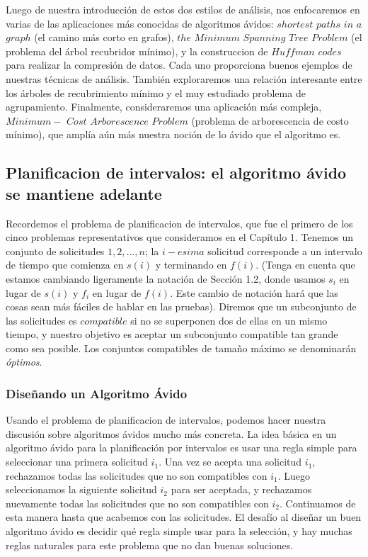 \documentclass[a4paper, 12pt]{book}
\begin{document}
Luego de nuestra introducción de estos dos estilos de análisis, nos enfocaremos en varias de las aplicaciones más conocidas de algoritmos ávidos: $shortest$ $paths$ $in$ $a$ $graph$ (el camino más corto en grafos), $the$ $Minimum$ $Spanning$ $Tree$ $Problem$ (el problema del árbol recubridor mínimo), y la construccion de $Huffman$ $codes$ para realizar la compresión de datos. Cada uno proporciona buenos ejemplos de nuestras técnicas de análisis. También exploraremos una relación interesante entre los árboles de recubrimiento mínimo y el muy estudiado problema de agrupamiento. Finalmente, consideraremos una aplicación más compleja, $Minimum-$ $Cost$ $Arborescence$ $Problem$ (problema de arborescencia de costo mínimo), que amplía aún más nuestra noción de lo ávido que el algoritmo es.\\


\subsection{Planificacion de intervalos: el algoritmo ávido se mantiene adelante} Recordemos el problema de planificacion de intervalos, que fue el primero de los cinco problemas representativos que consideramos en el Capítulo 1. Tenemos un conjunto de solicitudes ${1, 2,. . . , n}$; la $i- esima$ solicitud corresponde a un intervalo de tiempo que comienza en $s(i)$ y terminando en $f (i)$. (Tenga en cuenta que estamos cambiando ligeramente la notación de Sección 1.2, donde usamos $s_i$ en lugar de $s(i)$ y $f_i$ en lugar de $f(i)$. Este cambio de notación hará que las cosas sean más fáciles de hablar en las pruebas). Diremos que un subconjunto de las solicitudes es $compatible$ si no se superponen dos de ellas en un mismo tiempo, y nuestro objetivo es aceptar un subconjunto compatible tan grande como sea posible. Los conjuntos compatibles de tamaño máximo se denominarán \textit{óptimos}.\\

\subsubsection*{Diseñando un Algoritmo Ávido}

Usando el problema de planificacion de intervalos, podemos hacer nuestra discusión sobre algoritmos ávidos mucho más concreta. La idea básica en un algoritmo ávido para la planificación por intervalos es usar una regla simple para seleccionar una primera solicitud $i_1$. Una vez se acepta una solicitud $i_1$, rechazamos todas las solicitudes que no son compatibles con $i_1$. Luego seleccionamos la siguiente solicitud $i_2$ para ser aceptada, y rechazamos nuevamente todas las solicitudes que no son compatibles con $i_2$. Continuamos de esta manera hasta que acabemos con las solicitudes. El desafío al diseñar un buen algoritmo ávido es decidir qué regla simple usar para la selección, y hay muchas reglas naturales para este problema que no dan buenas soluciones.\\
\end{document}
